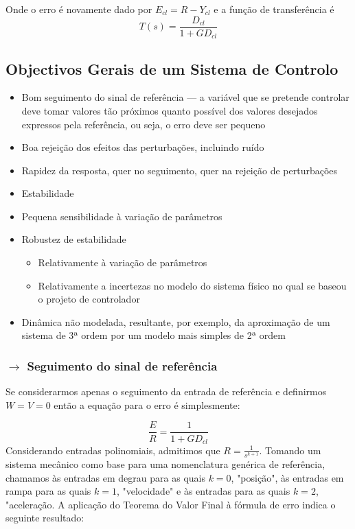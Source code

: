 \noindent Onde o erro é novamente dado por $E_{cl} = R - Y_{cl}$ e a função de transferência é
$$
    \boxed{T(s) = \dfrac{D_{cl}}{1 + GD_{cl}}}
$$

\newpage
\subsection[3.2 Objectivos Gerais de um Sistema de Controlo]{\hspace*{0.075 em}\raisebox{0.2 em}{$\pmb{\drsh}$} Objectivos Gerais de um Sistema de Controlo}
\label{sec:obj-gerais-cont}

\begin{itemize}
\item Bom seguimento do sinal de referência --- a variável que se pretende controlar deve tomar valores tão próximos quanto possível dos valores desejados expressos pela referência, ou seja, o erro deve ser pequeno
\item Boa rejeição dos efeitos das perturbações, incluindo ruído
\item Rapidez da resposta, quer no seguimento, quer na rejeição de perturbações
\item Estabilidade
\item Pequena sensibilidade à variação de parâmetros
\item Robustez de estabilidade
\begin{itemize}
    \item Relativamente à variação de parâmetros
    \item Relativamente a incertezas no modelo do sistema físico no qual se baseou o projeto de controlador
\end{itemize}
\item Dinâmica não modelada, resultante, por exemplo, da aproximação de um sistema de 3ª ordem por um modelo mais simples de 2ª ordem
\end{itemize}

\subsubsection[3.2.1 Seguimento do sinal de referência]{$\pmb{\rightarrow}$ Seguimento do sinal de referência}
\noindent Se considerarmos apenas o seguimento da entrada de referência e definirmos $W = V = 0$ então a equação para o erro é simplesmente:

$$
    \dfrac{E}{R} = \dfrac{1}{1 + GD_{cl}}
$$
\noindent Considerando entradas polinomiais, admitimos que $R = \frac{1}{s^{k + 1}}$. Tomando um sistema mecânico como base para uma nomenclatura genérica de referência, chamamos às entradas em degrau para as quais $k = 0$, "posição", às entradas em rampa para as quais $k = 1$, "velocidade" e  às entradas para as quais $k = 2$, "aceleração. A aplicação do Teorema do Valor Final à fórmula de erro indica o seguinte resultado:

